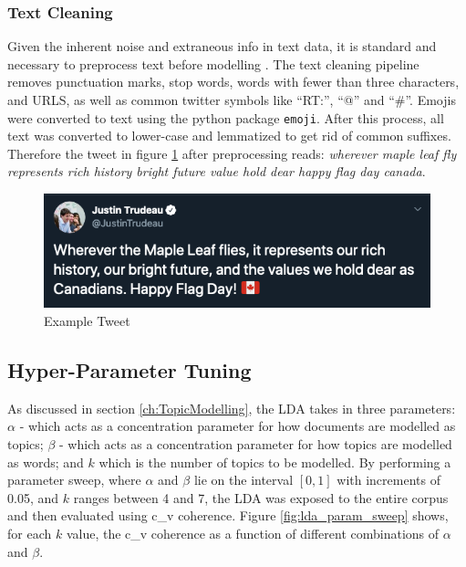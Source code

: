 \subsubsection{Text Cleaning}

Given the inherent noise and extraneous info in text data, it is standard and
necessary to preprocess text before modelling \cite{sapul2017trending}. The text
cleaning pipeline removes punctuation marks, stop words, words with fewer than
three characters, and URLS, as well as common twitter symbols like ``RT:'',
``@'' and ``\#''. Emojis were converted to text using the python package
\texttt{emoji}. After this process, all text was converted to lower-case and
lemmatized to get rid of common suffixes. Therefore the tweet in figure
\ref{fig:tweet_ex} after preprocessing reads: \emph{wherever maple leaf fly
represents rich history bright future value hold dear happy flag day canada}.

\begin{singlespacing}
    \begin{figure}[H]
    \centering
    \includegraphics[scale=0.55]{Figures/tweet_ex}
    \caption[Example Tweet]{Example Tweet}
    \label{fig:tweet_ex}
    \end{figure}
\end{singlespacing}

\subsection{Hyper-Parameter Tuning}\label{sec:TopicModellingHP}

As discussed in section \ref{ch:TopicModelling}, the LDA takes in three
parameters: $\alpha$ - which acts as a concentration parameter for how documents
are modelled as topics; $\beta$ - which acts as a concentration parameter for
how topics are modelled as words; and $k$ which is the number of topics to be
modelled. By performing a parameter sweep, where $\alpha$ and $\beta$ lie on the
interval $\left[0,1\right]$ with increments of 0.05, and $k$ ranges between 4
and 7, the LDA was exposed to the entire corpus and then evaluated using c\_v
coherence. Figure \ref{fig:lda_param_sweep} shows, for each $k$ value, the c\_v
coherence as a function of different combinations of $\alpha$ and $\beta$.

